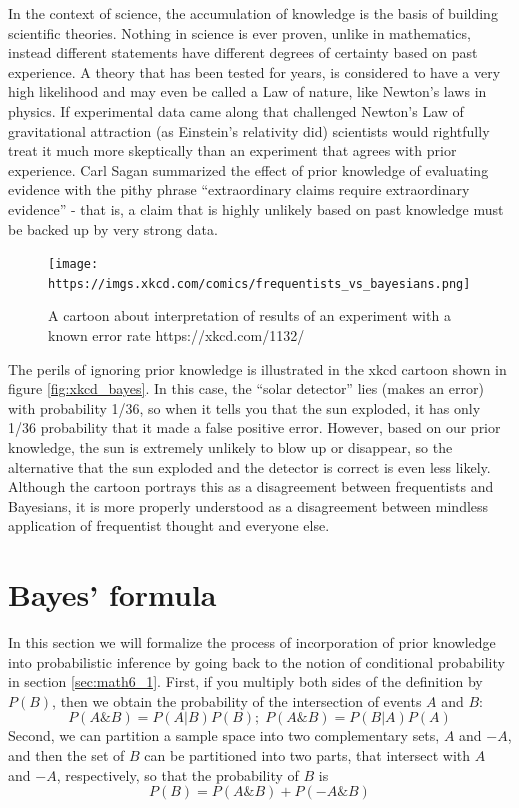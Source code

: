 \documentclass[
  letterpaper,
  DIV=11,
  numbers=noendperiod]{scrreprt}
\begin{document}
In the context of science, the accumulation of knowledge is the basis of
building scientific theories. Nothing in science is ever proven, unlike
in mathematics, instead different statements have different degrees of
certainty based on past experience. A theory that has been tested for
years, is considered to have a very high likelihood and may even be
called a Law of nature, like Newton's laws in physics. If experimental
data came along that challenged Newton's Law of gravitational attraction
(as Einstein's relativity did) scientists would rightfully treat it much
more skeptically than an experiment that agrees with prior experience.
Carl Sagan summarized the effect of prior knowledge of evaluating
evidence with the pithy phrase ``extraordinary claims require
extraordinary evidence'' - that is, a claim that is highly unlikely
based on past knowledge must be backed up by very strong data.

\begin{figure}

{\centering \texttt{[image: https://imgs.xkcd.com/comics/frequentists\_vs\_bayesians.png]}

}

\caption{A cartoon about interpretation of results of an experiment with
a known error rate https://xkcd.com/1132/}

\end{figure}

The perils of ignoring prior knowledge is illustrated in the xkcd
cartoon shown in figure \ref{fig:xkcd_bayes}. In this case, the ``solar
detector'' lies (makes an error) with probability 1/36, so when it tells
you that the sun exploded, it has only 1/36 probability that it made a
false positive error. However, based on our prior knowledge, the sun is
extremely unlikely to blow up or disappear, so the alternative that the
sun exploded and the detector is correct is even less likely. Although
the cartoon portrays this as a disagreement between frequentists and
Bayesians, it is more properly understood as a disagreement between
mindless application of frequentist thought and everyone else.

\hypertarget{bayes-formula}{%
\section{Bayes' formula}\label{bayes-formula}}

\label{sec:math7}

In this section we will formalize the process of incorporation of prior
knowledge into probabilistic inference by going back to the notion of
conditional probability in section \ref{sec:math6_1}. First, if you
multiply both sides of the definition by \(P(B)\), then we obtain the
probability of the intersection of events \(A\) and \(B\):
\[P(A \& B) = P(A|B) P(B); \;  P(A \& B) = P(B|A) P(A) \] Second, we can
partition a sample space into two complementary sets, \(A\) and \(-A\),
and then the set of \(B\) can be partitioned into two parts, that
intersect with \(A\) and \(-A\), respectively, so that the probability
of \(B\) is \[P(B) = P(A \& B) + P(-A\& B)\]
\end{document}
